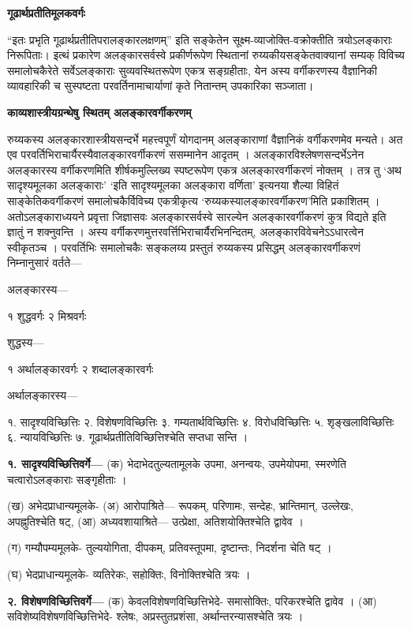 \documentclass[10pt, a5paper, twoside]{article}
\newcommand{\customparagraph}[1]{
    \noindent \textbf{#1} \par
    \penalty 10000 %
    \vspace{0.1cm plus 0.05cm minus 0.02cm}
    \penalty 10000 %
}
\begin{document}
\customparagraph{\textbf{गूढार्थप्रतीतिमूलकवर्गः}}

``इतः प्रभृति गूढार्थप्रतीतिपरालङ्कारलक्षणम्'' इति सङ्केतेन सूक्ष्म-व्याजोक्ति-वक्रोक्तीति त्रयोऽलङ्काराः निरूपिताः। इत्थं प्रकारेण अलङ्कारसर्वस्वे प्रकीर्णरूपेण स्थितानां रुय्यकीयसङ्केतवाक्यानां सम्यक् विविच्य समालोचकैरेते सर्वेऽलङ्काराः सुव्यवस्थितरूपेण एकत्र सङ्ग्रहीताः, येन अस्य वर्गीकरणस्य वैज्ञानिकी व्यावहारिकी च सुस्पष्टता परवर्तिनामाचार्याणां कृते नितान्तम् उपकारिका सञ्जाता।

\customparagraph{\textbf{काव्यशास्त्रीयग्रन्थेषु स्थितम् अलङ्कारवर्गीकरणम्}}

रुय्यकस्य अलङ्कारशास्त्रीयसन्दर्भे महत्त्वपूर्णं योगदानम् अलङ्काराणां वैज्ञानिकं वर्गीकरणमेव मन्यते। अत एव परवर्तिभिराचार्यैरस्यैवालङ्कारवर्गीकरणं ससम्मानेन आदृतम् ।
अलङ्कारविश्लेषणसन्दर्भेऽनेन अलङ्कारस्य वर्गीकरणमिति शीर्षकमुल्लिख्य स्पष्टरूपेण एकत्र अलङ्कारवर्गीकरणं नोक्तम् । तत्र तु ‘अथ सादृश्यमूलका अलङ्काराः’ ‘इति सादृश्यमूलका अलङ्कारा वर्णिता’ इत्यनया शैल्या विहितं साङ्केतिकवर्गीकरणं समालोचकैर्विविच्य एकत्रीकृत्य ‘रुय्यकस्यालङ्कारवर्गीकरण’मिति प्रकाशितम् । अतोऽलङ्काराध्ययने प्रवृत्ता जिज्ञासवः अलङ्कारसर्वस्वे सारल्येन अलङ्कारवर्गीकरणं कुत्र विद्यते इति ज्ञातुं न शक्नुवन्ति । अस्य वर्गीकरणमुत्तरवर्त्तिभिराचार्यैरभिनन्दितम्, अलङ्कारविवेचनेऽऽधारत्वेन स्वीकृतञ्च । परवर्तिभिः समालोचकैः सङ्कलय्य प्रस्तुतं रुय्यकस्य प्रसिद्धम् अलङ्कारवर्गीकरणं निम्नानुसारं वर्तते—

अलङ्कारस्य—

१ शुद्धवर्गः २ मिश्रवर्गः

शुद्धस्य—

१ अर्थालङ्कारवर्गः २ शब्दालङ्कारवर्गः

अर्थालङ्कारस्य—

१. सादृश्यविच्छित्तिः २. विशेषणविच्छित्तिः ३. गम्यतार्थविच्छित्तिः ४. विरोधविच्छित्तिः ५. शृङ्खलाविच्छित्तिः ६. न्यायविच्छित्तिः ७. गूढार्थप्रतीतिविच्छित्तिश्चेति सप्तधा सन्ति ।

\textbf{१. सादृश्यविच्छित्तिवर्गे—}  (क) भेदाभेदतुल्यतामूलके  उपमा, अनन्वयः, उपमेयोपमा, स्मरणेति चत्वारोऽलङ्काराः सङ्गृहीताः ।

(ख) अभेदप्राधान्यमूलके-  (अ) आरोपाश्रिते— रूपकम्, परिणामः, सन्देहः, भ्रान्तिमान्, उल्लेखः, अपह्नुतिश्चेति षट्, (आ) अध्यवशायाश्रिते— उत्प्रेक्षा, अतिशयोक्तिश्चेति द्वावेव ।

(ग) गम्यौपम्यमूलके-  तुल्ययोगिता, दीपकम्, प्रतिवस्तूपमा, दृष्टान्तः, निदर्शना चेति षट् ।

(घ) भेदप्राधान्यमूलके-  व्यतिरेकः, सहोक्तिः, विनोक्तिश्चेति त्रयः ।

\textbf{२. विशेषणविच्छित्तिवर्गे—} (क) केवलविशेषणविच्छित्तिभेदे-  समासोक्तिः, परिकरश्चेति द्वावेव । (आ) सविशेष्यविशेषणविच्छित्तिभेदे-  श्लेषः, अप्रस्तुतप्रशंसा, अर्थान्तरन्यासश्चेति त्रयः ।
\end{document}
